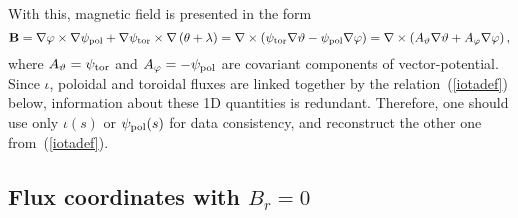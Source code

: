 \documentclass[12pt]{article}
\newcommand{\be}[1]{\begin{equation} \label{#1}}
\newcommand{\ee}{\end{equation}}
\newcommand{\eq}[1]{(\ref{#1})}
\newcommand{\bB}{{\bf B}}
\begin{document}
\noindent
With this, magnetic field is presented in the form
\be{magfieldform}
\bB=\nabla\varphi\times\nabla\psi_{\rm pol}+\nabla\psi_{\rm tor}\times\nabla\left(\theta+\lambda\right)
=\nabla\times\left(\psi_{\rm tor}\nabla\vartheta-\psi_{\rm pol}\nabla\varphi\right)
=\nabla\times\left(A_\vartheta\nabla\vartheta+A_\varphi\nabla\varphi\right),
\ee
where $A_\vartheta=\psi_{\rm tor}$ and $A_\varphi=-\psi_{\rm pol}$ are covariant components of vector-potential.
Since $\iota$, poloidal and toroidal fluxes are linked together by the relation~\eq{iotadef} below, 
information about these
1D quantities is redundant. Therefore, one should use only $\iota(s)$ or $\psi_{\rm pol}(s)$ for data consistency,
and reconstruct the other one from~\eq{iotadef}.

\subsection{Flux coordinates with $B_r=0$}
\end{document}
